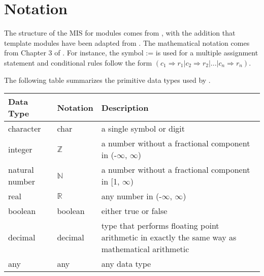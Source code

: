 \documentclass[12pt, titlepage]{article}
\begin{document}
\section{Notation}

The structure of the MIS for modules comes from \citet{HoffmanAndStrooper1995},
with the addition that template modules have been adapted from
\cite{GhezziEtAl2003}.  The mathematical notation comes from Chapter 3 of
\citet{HoffmanAndStrooper1995}.  For instance, the symbol := is used for a
multiple assignment statement and conditional rules follow the form $(c_1
\Rightarrow r_1 | c_2 \Rightarrow r_2 | ... | c_n \Rightarrow r_n )$.

The following table summarizes the primitive data types used by \progname.

\begin{center}
  \renewcommand{\arraystretch}{1.2}
  \noindent
  \begin{tabular}{l l p{7.5cm}}
    \toprule
    \textbf{Data Type} & \textbf{Notation} & \textbf{Description}\\
    \midrule
    character & char & a single symbol or digit\\
    integer & $\mathbb{Z}$ & a number without a fractional component
    in (-$\infty$, $\infty$) \\
    natural number & $\mathbb{N}$ & a number without a fractional
    component in [1, $\infty$) \\
    real & $\mathbb{R}$ & any number in (-$\infty$, $\infty$)\\
    boolean & boolean & either true or false\\
    decimal & decimal & type that performs floating point arithmetic in exactly
    the same way as mathematical arithmetic\\
    any & any & any data type\\
    \bottomrule
  \end{tabular}
\end{center}
\end{document}
